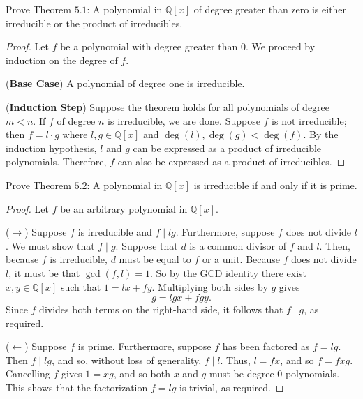 \begin{tcolorbox}[title=Problem 1, breakable]
    Prove Theorem $5.1$: A polynomial in $\mathbb{Q}[x]$
    of degree greater than zero is either irreducible
    or the product of irreducibles.
\end{tcolorbox}

\begin{proof}
    Let $f$ be a polynomial with degree greater than $0$.
    We proceed by induction on the degree of $f$.

    (\textbf{Base Case}) A polynomial of degree one is irreducible.

    (\textbf{Induction Step}) 
    Suppose the theorem holds for all polynomials of degree $m < n$.
    If $f$ of degree $n$ is irreducible, we are done.
    Suppose $f$ is not irreducible; then $f = l \cdot g$ where $l, g \in \mathbb{Q}[x]$ 
    and $\deg(l), \deg(g) < \deg(f)$.
    By the induction hypothesis, $l$ and $g$ can be expressed as a product of irreducible polynomials.
    Therefore, $f$ can also be expressed as a product of irreducibles.
\end{proof}

\begin{tcolorbox}[title=Problem 2, breakable]
    Prove Theorem $5.2$: A polynomial in $\mathbb{Q}[x]$
    is irreducible if and only if it is prime.
\end{tcolorbox}

\begin{proof}
    Let $f$ be an arbitrary polynomial in $\mathbb{Q}[x]$.

    ($\rightarrow$) Suppose $f$ is irreducible and $f \mid l g$.
    Furthermore, suppose $f$ does not divide $l$.
    We must show that $f \mid g$.
    Suppose that $d$ is a common divisor of $f$ and $l$.
    Then, because $f$ is irreducible, $d$ must 
        be equal to $f$ or a unit.
    Because $f$ does not divide $l$, it must be that    
        $\gcd(f, l) = 1$.
    So by the GCD identity there exist $x, y \in \mathbb{Q}[x]$
        such that $1 = l x + f y$. 
    Multiplying both sides by $g$ gives
        \[ g = l g x + f g y. \]
    Since $f$ divides both terms on the right-hand side,
        it follows that $f \mid g$, as required.

    ($\leftarrow$) Suppose $f$ is prime.
    Furthermore, suppose $f$ has been factored as $f = l g$.
    Then $f \mid l g$, and so, without loss of generality,
        $f \mid l$.
    Thus, $l = f x$, and so $f = f x g$. 
    Cancelling $f$ gives $1 = x g$, and so both $x$ and $g$
        must be degree $0$ polynomials.
    This shows that the factorization $f = l g$
        is trivial, as required.
\end{proof}

